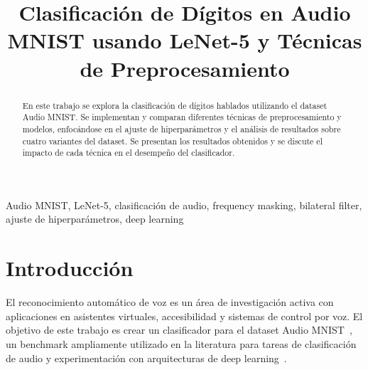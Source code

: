 \documentclass[conference]{IEEEtran}
\begin{document}
\title{Clasificación de Dígitos en Audio MNIST usando LeNet-5 y Técnicas de Preprocesamiento}

\author{
    \and
    \and
}

\maketitle

\begin{abstract}
En este trabajo se explora la clasificación de dígitos hablados utilizando el dataset Audio MNIST. Se implementan y comparan diferentes técnicas de preprocesamiento y modelos, enfocándose en el ajuste de hiperparámetros y el análisis de resultados sobre cuatro variantes del dataset. Se presentan los resultados obtenidos y se discute el impacto de cada técnica en el desempeño del clasificador.
\end{abstract}

\begin{IEEEkeywords}
Audio MNIST, LeNet-5, clasificación de audio, frequency masking, bilateral filter, ajuste de hiperparámetros, deep learning
\end{IEEEkeywords}

\section{Introducción}
El reconocimiento automático de voz es un área de investigación activa con aplicaciones en asistentes virtuales, accesibilidad y sistemas de control por voz. El objetivo de este trabajo es crear un clasificador para el dataset Audio MNIST~\cite{audio_mnist_original}, un benchmark ampliamente utilizado en la literatura para tareas de clasificación de audio y experimentación con arquitecturas de deep learning~\cite{audio_mnist_cnn,audio_mnist_transfer}. 
\end{document}
